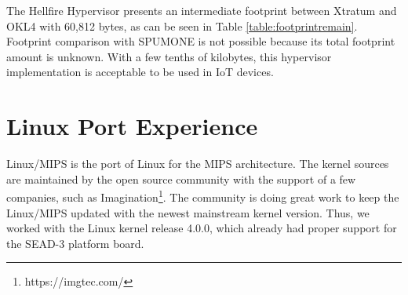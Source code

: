 The Hellfire Hypervisor presents an intermediate footprint between Xtratum and OKL4 with 60,812 bytes, as can be seen in Table \ref{table:footprintremain}. Footprint comparison with SPUMONE is not possible because its total footprint amount is unknown.  With a few tenths of kilobytes, this hypervisor implementation is acceptable to be used in IoT devices. 


\section{Linux Port Experience}
\label{section6:linuxport}

Linux/MIPS is the port of Linux for the MIPS architecture. The kernel sources are maintained by the open source community with the support of a few companies, such as Imagination\footnote{https://imgtec.com/}. The community is doing great work to keep the Linux/MIPS updated with the newest mainstream kernel version. Thus, we worked with the Linux kernel release 4.0.0, which already had proper support for the SEAD-3 platform board.

